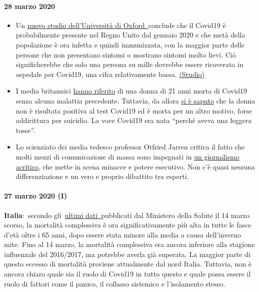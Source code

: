 \hypertarget{28-marzo-2020}{%
\paragraph{28 marzo 2020}\label{28-marzo-2020}}

\begin{itemize}
\tightlist
\item
  Un
  \href{https://news.yahoo.com/oxford-study-suggests-millions-people-221100162.html}{nuovo
  studio dell'Università di Oxford~}conclude che il Covid19 è
  probabilmente presente nel Regno Unito dal gennaio 2020 e che metà
  della popolazione è ora infetta e quindi immunizzata, con la maggior
  parte delle persone che non presentano sintomi o mostrano sintomi
  molto lievi. Ciò significherebbe che solo una persona su mille
  dovrebbe essere ricoverata in ospedale per Covid19, una cifra
  relativamente bassa.
  \href{https://www.medrxiv.org/content/10.1101/2020.03.24.20042291v1}{(Studio)}
\item
  I media britannici
  \href{https://www.bbc.com/news/uk-england-beds-bucks-herts-52041709}{hanno
  riferito} di una donna di 21 anni morta di Covid19 senza alcuna
  malattia precedente. Tuttavia, da allora
  \href{https://archive.is/20200329015127/https:/www.theguardian.com/world/2020/mar/27/chloe-middleton-death-21-year-old-not-recorded-nhs-covid-19-related}{si
  è saputo} che la donna non è risultata positiva al test Covid19 ed è
  morta per un altro motivo, forse addirittura per suicidio. La voce
  Covid19 era nata ``perché aveva una leggera tosse''.
\item
  Lo scienziato dei media tedesco professor Otfried Jarren critica il
  fatto che molti mezzi di comunicazione di massa sono impegnati in
  \href{https://www.deutschlandfunk.de/covid-19-scharfe-kritik-an-ard-und-zdf-wegen.2849.de.html?drn:news_id=1114517}{un
  giornalismo acritico}, che mette in scena minacce e potere esecutivo.
  Non c'è quasi nessuna differenziazione e un vero e proprio dibattito
  tra esperti.
\end{itemize}

\hypertarget{27-marzo-2020-i}{%
\paragraph{27 marzo 2020 (I)}\label{27-marzo-2020-i}}

\textbf{Italia}:~secondo
gli~\href{http://www.salute.gov.it/portale/caldo/SISMG_sintesi_ULTIMO.pdf}{ultimi
dati~}pubblicati dal Ministero della Salute il 14 marzo scorso, la
mortalità complessiva è ora significativamente più alta in tutte le
fasce d'età oltre i 65 anni, dopo essere stata minore alla media a causa
dell'inverno mite. Fino al 14 marzo, la mortalità complessiva era ancora
inferiore alla stagione influenzale del 2016/2017, ma potrebbe averla
già superata. La maggior parte di questo eccesso di mortalità proviene
attualmente dal nord Italia. Tuttavia, non è ancora chiaro quale sia il
ruolo di Covid19 in tutto questo e quale possa essere il ruolo di
fattori come il panico, il collasso sistemico e l'isolamento stesso.

